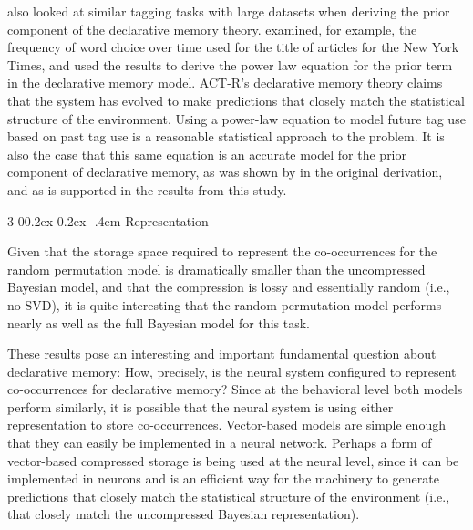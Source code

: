 \documentclass[man,donotrepeattitle]{apa6}
\makeatletter
\renewcommand{\subsubsection}{%
  \@startsection
  {subsubsection}%
  {3}%
  {\parindent}%
  {0\baselineskip \@plus 0.2ex \@minus 0.2ex}%
  {-.4em}%
  {\normalfont\normalsize\bfseries\addperi}}
\makeatother
\begin{document}
\textcite{Anderson1991} also looked at similar tagging tasks with large datasets when deriving the prior component of the declarative memory theory.
\citeauthor{Anderson1991} examined, for example, the frequency of word choice over time used for the title of articles for the New York Times,
and used the results to derive the power law equation for the prior term in the declarative memory model.
ACT-R's declarative memory theory claims that the system has evolved to make predictions that closely match the statistical structure of the environment.
Using a power-law equation to model future tag use based on past tag use is a reasonable statistical approach to the problem.
It is also the case that this same equation is an accurate model for the prior component of declarative memory, as was shown by \citeauthor{Anderson1991} in the original derivation, 
and as is supported in the results from this study.

\subsubsection{Representation}

Given that the storage space required to represent the co-occurrences for the random permutation model is dramatically smaller than the uncompressed Bayesian model,
and that the compression is lossy and essentially random (i.e., no SVD),
it is quite interesting that the random permutation model performs nearly as well as the full Bayesian model for this task.

These results pose an interesting and important fundamental question about declarative memory:
How, precisely, is the neural system configured to represent co-occurrences for declarative memory?
Since at the behavioral level both models perform similarly, it is possible that the neural system is using either representation to store co-occurrences.
Vector-based models are simple enough that they can easily be implemented in a neural network.
Perhaps a form of vector-based compressed storage is being used at the neural level,
since it can be implemented in neurons and is an efficient way for the machinery to generate predictions that closely match the statistical structure of the environment
(i.e., that closely match the uncompressed Bayesian representation).
\end{document}
